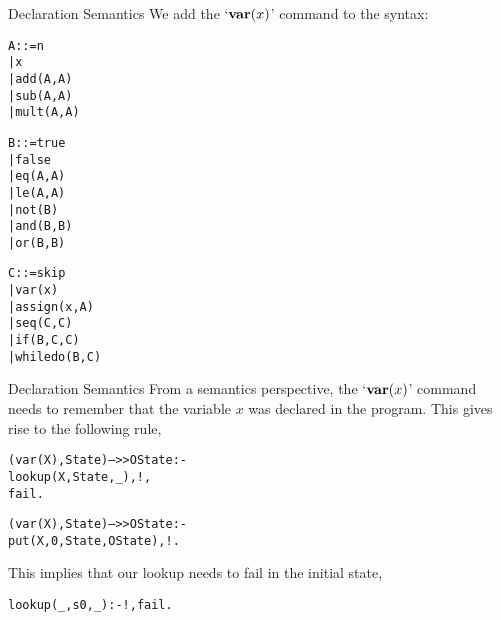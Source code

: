 \documentclass{beamer}
\begin{document}
\begin{frame}[fragile]{\large Declaration Semantics}
We add the `${\bf var}(x)$' command to the syntax:

\vspace{.1in}

\begin{minipage}[t]{1.8in}
\tiny
\begin{alltt}
  A ::= n
     |  x
     |  add(A,A)
     |  sub(A,A)
     |  mult(A,A)

  B ::= true
     |  false
     |  eq(A,A)
     |  le(A,A)
     |  not(B)
     |  and(B,B)
     |  or(B,B)
\end{alltt}
\end{minipage}
\begin{minipage}[t]{1.8in}
\tiny
\begin{alltt}

  C ::= skip
     |  {\color{red}var(x)}      
     |  assign(x,A)
     |  seq(C,C)
     |  if(B,C,C)
     |  whiledo(B,C)
\end{alltt}
\end{minipage}
\end{frame}


\begin{frame}[fragile]{\large Declaration Semantics}
From a semantics perspective, the `${\bf var}(x)$' command needs to remember that the variable $x$ was declared in the program.  This gives rise to the following rule,

\vspace{.1in}

{\tiny
\begin{alltt}
(var(X),State) -->> OState :-          % decl, if lookup is successful
    lookup(X,State,_),!,	       % then var(x) must fail,	only
    fail.			       % one var declaration allowed

(var(X),State) -->> OState :-          % decl, we have shown that lookup is not
    put(X,0,State,OState),!.           % successful, therefore enter the new var

\end{alltt}
}

\vspace{.1in}

This implies that our lookup needs to fail in the initial state,

\vspace{.1in}

{\tiny
\begin{alltt}
lookup(_,s0,_) :- !,fail.
\end{alltt}
}

\end{frame}
\end{document}
